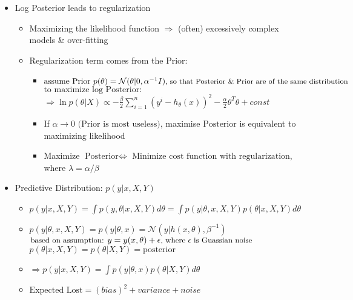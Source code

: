 \begin{itemize}
\begin{itemize}
	\end{itemize}

\item Log Posterior leads to regularization

	\begin{itemize}
	\item Maximizing the likelihood function $\Rightarrow$ (often) excessively complex models \& over-fitting
	\item Regularization term comes from the $\text{Prior}$: 
		\begin{itemize}
		\item $\text{assume Prior } p(\theta) =  \mathcal{N}(\theta|0,\alpha^{-1}I) \text{\small , so that Posterior \& Prior are of the same distribution}$ \\
		$\text{to maximize log Posterior}:$ \\ 
		$\displaystyle \Rightarrow \ln p(\theta|X) \propto -\frac \beta 2 \sum_{i=1}^n (y^i - h_\theta(x))^2 - \frac \alpha 2 \theta^T\theta + const$
		
		\item If $\alpha \to 0 \text { (Prior is most useless)}$, maximise $\text{Posterior}$ is equivalent to maximizing likelihood 
		\item Maximize $\text{Posterior} \Leftrightarrow$ Minimize $\text{cost function with regularization}$, where $\lambda = \alpha/\beta$ 
		\end{itemize}
	\end{itemize}
		
\item Predictive Distribution: $p(y|x,X,Y)$ 

	\begin{itemize}
	\item $\displaystyle p(y|x,X,Y) = \int p(y,\theta|x,X,Y)d\theta = \int p(y|\theta,x,X,Y)p(\theta|x,X,Y)d\theta$ 
	
	\item $p(y|\theta,x,X,Y)=p(y|\theta,x) = \mathcal{N}(y|h(x,\theta), \beta^{-1})$ \\ 
	\(\small  \text{based on assumption: } y = y(x,\theta)+\epsilon \text{, where $\epsilon$ is Guassian noise}\) \\ 
	\(p(\theta|x,X,Y)=p(\theta|X,Y) = \text{posterior} \)
	
	\item  $ \displaystyle \Rightarrow p(y|x,X,Y)=\int p(y|\theta,x) p(\theta|X,Y)d\theta$   

	\item  $\text{Expected Lost}  = (bias)^2 + variance + noise$ 
	\end{itemize}
		

\end{itemize}
